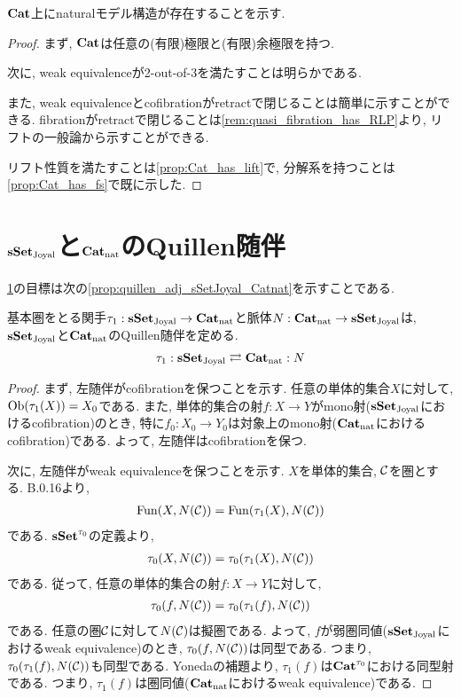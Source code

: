 \documentclass[uplatex, a4paper, 14Q, dvipdfmx]{jsarticle}
\begin{document}
$\mathbf{Cat}$上にnaturalモデル構造が存在することを示す.

\begin{proof}
  まず, $\mathbf{Cat}$は任意の(有限)極限と(有限)余極限を持つ. 

  次に, weak equivalenceが2-out-of-3を満たすことは明らかである. 

  また, weak equivalenceとcofibrationがretractで閉じることは簡単に示すことができる.
  fibrationがretractで閉じることは\cref{rem:quasi_fibration_has_RLP}より, リフトの一般論から示すことができる. 

  リフト性質を満たすことは\cref{prop:Cat_has_lift}で, 分解系を持つことは\cref{prop:Cat_has_fs}で既に示した. 
\end{proof}

\section{$\mathbf{sSet}_\mathrm{Joyal}$と$\mathbf{Cat}_\mathrm{nat}$のQuillen随伴} \label{sec:quillen_adj_sSetJoyal_Catnat}

\cref{sec:quillen_adj_sSetJoyal_Catnat}の目標は次の\cref{prop:quillen_adj_sSetJoyal_Catnat}を示すことである. 

\begin{proposition} \label{prop:quillen_adj_sSetJoyal_Catnat}
  基本圏をとる関手$\tau_1 : \mathbf{sSet}_\mathrm{Joyal} \to \mathbf{Cat}_\mathrm{nat}$と脈体$N : \mathbf{Cat}_\mathrm{nat} \to \mathbf{sSet}_\mathrm{Joyal}$は, $\mathbf{sSet}_\mathrm{Joyal}$と$\mathbf{Cat}_\mathrm{nat}$のQuillen随伴を定める.
  \begin{align*}
    \tau_1 : \mathbf{sSet}_\mathrm{Joyal} \rightleftarrows \mathbf{Cat}_\mathrm{nat} : N
  \end{align*}
\end{proposition}

\begin{proof}
  まず, 左随伴がcofibrationを保つことを示す.
  任意の単体的集合$X$に対して, $\mathrm{Ob}(\tau_1(X))=X_0$である.
  また, 単体的集合の射$f : X \to Y$がmono射($\mathbf{sSet}_\mathrm{Joyal}$におけるcofibration)のとき, 特に$f_0 : X_0 \to Y_0$は対象上のmono射($\mathbf{Cat}_\mathrm{nat}$におけるcofibration)である. 
  よって, 左随伴はcofibrationを保つ.

  次に, 左随伴がweak equivalenceを保つことを示す.
  $X$を単体的集合, $\mathcal{C}$を圏とする.
  \cite{Joy08} B.0.16より, 
  \begin{align*}
    \mathrm{Fun}(X,N(\mathcal{C})) = \mathrm{Fun}(\tau_1(X),N(\mathcal{C}))
  \end{align*}
  である. 
  $\mathbf{sSet}^{\tau_0}$の定義より, 
  \begin{align*}
    \tau_0(X,N(\mathcal{C}))=\tau_0(\tau_1(X),N(\mathcal{C}))
  \end{align*}
  である. 
  従って, 任意の単体的集合の射$f : X \to Y$に対して, 
  \begin{align*}
    \tau_0(f,N(\mathcal{C}))=\tau_0(\tau_1(f),N(\mathcal{C}))
  \end{align*}
  である. 
  任意の圏$\mathcal{C}$に対して$N(\mathcal{C})$は擬圏である. 
  よって, $f$が弱圏同値($\mathbf{sSet}_\mathrm{Joyal}$におけるweak equivalence)のとき, $\tau_0(f,N(\mathcal{C}))$は同型である. 
  つまり, $\tau_0(\tau_1(f),N(\mathcal{C}))$も同型である. 
  Yonedaの補題より, $\tau_1(f)$は$\mathbf{Cat}^{\tau_0}$における同型射である. 
  つまり, $\tau_1(f)$は圏同値($\mathbf{Cat}_\mathrm{nat}$におけるweak equivalence)である. 
\end{proof}



\end{document}
